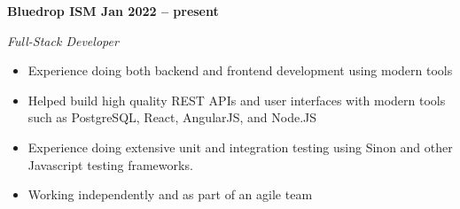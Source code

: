 \vspace{0.1cm}
\textbf{Bluedrop ISM \hfill Jan 2022 -- present} \par
\textit{Full-Stack Developer} \par
\begin{itemize}
	\item Experience doing both backend and frontend development using modern tools
    \item Helped build high quality REST APIs and user interfaces with modern tools such as PostgreSQL, React, AngularJS, and Node.JS
    \item Experience doing extensive unit and integration testing using Sinon and other Javascript testing frameworks.
    \item Working independently and as part of an agile team
\end{itemize} \par